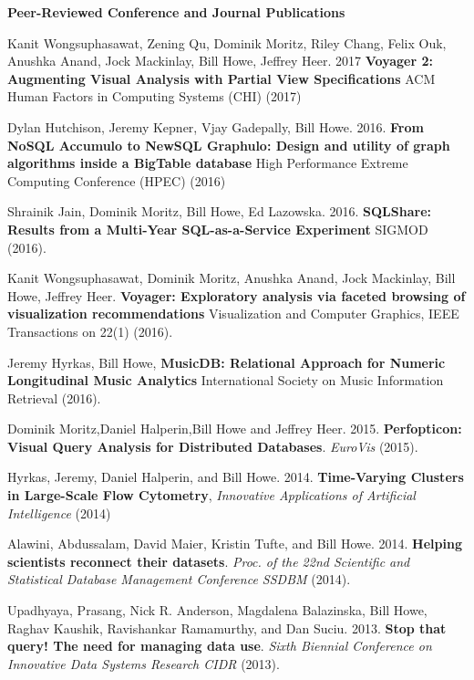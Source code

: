 
{\bf Peer-Reviewed Conference and Journal Publications}
\begin{bulletlist}

\item Kanit Wongsuphasawat, Zening Qu, Dominik Moritz, Riley Chang, Felix Ouk, Anushka Anand, Jock Mackinlay, Bill Howe, Jeffrey Heer. 2017
\textbf{Voyager 2: Augmenting Visual Analysis with Partial View Specifications}
ACM Human Factors in Computing Systems (CHI) (2017)

\item Dylan Hutchison, Jeremy Kepner, Vjay Gadepally, Bill Howe. 2016.
\textbf{From NoSQL Accumulo to NewSQL Graphulo: Design and utility of graph algorithms inside a BigTable database}
High Performance Extreme Computing Conference (HPEC) (2016)

\item Shrainik Jain, Dominik Moritz, Bill Howe, Ed Lazowska. 2016.
\textbf{SQLShare: Results from a Multi-Year SQL-as-a-Service Experiment}
SIGMOD (2016).

\item Kanit Wongsuphasawat, Dominik Moritz, Anushka Anand, Jock Mackinlay, Bill Howe, Jeffrey Heer. 
\textbf{Voyager: Exploratory analysis via faceted browsing of visualization recommendations}
Visualization and Computer Graphics, IEEE Transactions on 22(1) (2016).

\item  Jeremy Hyrkas, Bill Howe, \textbf{MusicDB: Relational Approach for Numeric Longitudinal Music Analytics}
International Society on Music Information Retrieval (2016).

\item Dominik Moritz,Daniel Halperin,Bill Howe and Jeffrey Heer. 2015.
\textbf{Perfopticon: Visual Query Analysis for Distributed Databases}.
\emph{EuroVis} (2015).

\item Hyrkas, Jeremy, Daniel Halperin, and Bill Howe. 2014. 
\textbf{Time-Varying Clusters in Large-Scale Flow Cytometry}, \emph{Innovative Applications of Artificial Intelligence} (2014)

\item Alawini, Abdussalam, David Maier, Kristin Tufte, and Bill Howe. 2014. 
\textbf{Helping scientists reconnect their datasets}. \emph{Proc. of the 22nd 
Scientific and Statistical Database Management Conference SSDBM} (2014).

\item Upadhyaya, Prasang, Nick R. Anderson, Magdalena Balazinska, Bill
Howe, Raghav Kaushik, Ravishankar Ramamurthy, and Dan Suciu. 2013. \textbf{Stop
that query! The need for managing data use}. \emph{Sixth Biennial Conference 
on Innovative Data Systems Research {CIDR}} (2013).


\end{bulletlist}
